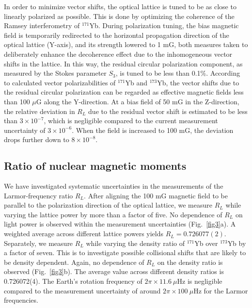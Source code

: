 \documentclass[pdflatex,sn-nature,centre]{sn-jnl}%
\begin{document}
In order to minimize vector shifts, the optical lattice is tuned to be as close to linearly polarized as possible. This is done by optimizing the coherence of the Ramsey interferometry of $^{171}$Yb. During polarization tuning, the bias magnetic field is temporarily redirected to the horizontal propagation direction of the optical lattice (Y-axis), and its strength lowered to 1 mG, both measures taken to deliberately enhance the decoherence effect due to the inhomogeneous vector shifts in the lattice. In this way, the residual circular polarization component, as measured by the Stokes parameter $S_3$, is tuned to be less than 0.1\%. According to calculated vector polarizabilities of $^{171}$Yb and $^{173}$Yb, the vector shifts due to the residual circular polarization can be regarded as effective magnetic fields less than 100 $\mu$G along the Y-direction. At a bias field of 50 mG in the Z-direction, the relative deviation in $R_L$ due to the residual vector shift is estimated to be less than $3\times10^{-7}$, which is negligible compared to the current measurement uncertainty of $3\times10^{-6}$. When the field is increased to 100 mG, the deviation drops further down to $8\times10^{-8}$.



\subsection*{Ratio of nuclear magnetic moments}

We have investigated systematic uncertainties in the measurements of the Larmor-frequency ratio $R_L$. After aligning the 100 mG magnetic field to be parallel to the polarization direction of the optical lattice, we measure $R_L$ while varying the lattice power by more than a factor of five. No dependence of $R_L$ on light power is observed within the measurement uncertainties (Fig.~\ref{fig3}a). A weighted average across different lattice powers yields $R_L = 0.726077(2)$.
Separately, we measure $R_L$ while varying the density ratio of $^{171}$Yb over $^{173}$Yb by a factor of seven. This is to investigate possible collisional shifts that are likely to be density dependent. Again, no dependence of $R_L$ on the density ratio is observed (Fig.~\ref{fig3}b). The average value across different density ratios is 0.726072(4). The Earth’s rotation frequency of $2\pi\times11.6\ \mu\mathrm{Hz}$ is negligible compared to the measurement uncertainty of around $2\pi\times100\ \mu\mathrm{Hz}$ for the Larmor frequencies.
\end{document}
